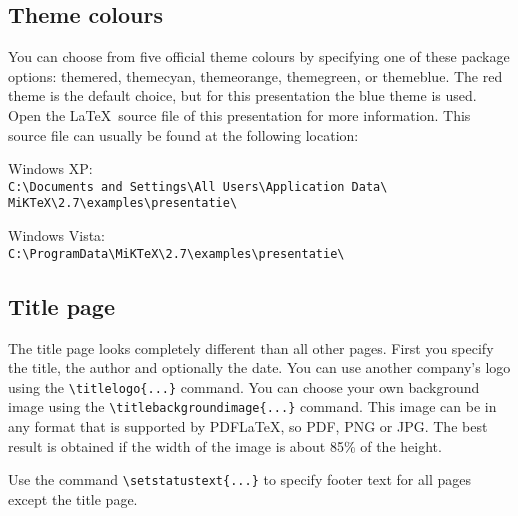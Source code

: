 \documentclass[a4paper]{article}            %
\begin{document}
\begin{slidetop}
\section*{Theme colours}

You can choose from five official theme colours by specifying one of these package options: {\color{tuecyan}themered},
{\color{tuecyan}themecyan},
{\color{tuecyan}themeorange},
{\color{tuecyan}themegreen}, or {\color{tuecyan}themeblue}. The red theme is the default choice, but for this presentation the blue theme is used. Open the \LaTeX\ source file of this presentation for more information. This source file can usually be found at the following location:

\bigskip
Windows XP:\\
\verb|C:\Documents and Settings\All Users\Application Data\|
\verb|MiKTeX\2.7\examples\presentatie\|

\bigskip
Windows Vista:\\ \verb|C:\ProgramData\MiKTeX\2.7\examples\presentatie\|
\end{slidetop}

\begin{slidetop}

\section*{Title page}

The title page looks completely different than all other pages. First you specify the title, the author and optionally the date.
You can use another company's logo using the \verb|\titlelogo{...}| command. You can choose your own background image using the
\verb|\titlebackgroundimage{...}| command. This image can be in any format that is supported by PDF\LaTeX, so PDF, PNG or JPG. The best result is obtained if the width of the image is about 85\% of the height.

Use the command \verb|\setstatustext{...}| to specify footer text for all pages except the title page.
\end{slidetop}
\end{document}
